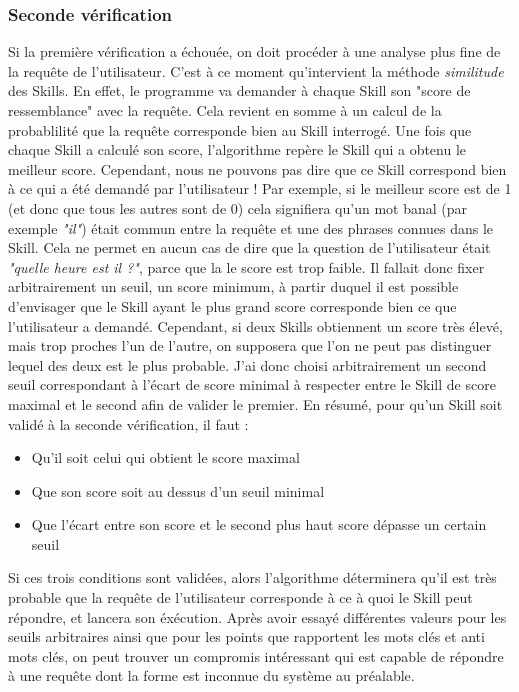\documentclass{report}
\begin{document}
      \subsubsection{Seconde vérification}
      {Si la première vérification a échouée, on doit procéder à une analyse plus
      fine de la requête de l'utilisateur. C'est à ce moment qu'intervient la
      méthode \textit{similitude} des Skills. En effet, le programme va demander
      à chaque Skill son "score de ressemblance" avec la requête. Cela revient
      en somme à un calcul de la probablilité que la requête corresponde bien au
      Skill interrogé. Une fois que chaque Skill a calculé son score, l'algorithme
      repère le Skill qui a obtenu le meilleur score. Cependant, nous ne pouvons
      pas dire que ce Skill correspond bien à ce qui a été demandé par l'utilisateur !
       Par exemple, si le meilleur score est de 1 (et donc que tous les autres sont de 0)
        cela signifiera qu'un mot banal (par exemple \textit{"il"}) était commun entre
        la requête et une des phrases connues dans le Skill. Cela ne permet en aucun cas
         de dire que la question de l'utilisateur était \textit{"quelle heure est il ?"}, parce
         que la le score est trop faible. Il fallait donc fixer arbitrairement un seuil, un score
          minimum, à partir duquel il est possible d'envisager que le Skill ayant
          le plus grand score corresponde bien ce que l'utilisateur a demandé. Cependant,
          si deux Skills obtiennent un score très élevé, mais trop proches l'un de l'autre,
           on supposera que l'on ne peut pas distinguer lequel des deux est le plus probable.
           J'ai donc choisi arbitrairement un second seuil correspondant à l'écart de score
           minimal à respecter entre le Skill de score maximal et le second afin de valider
           le premier.}
      {En résumé, pour qu'un Skill soit validé à la seconde vérification, il faut :}
      \begin{itemize}
        \item Qu'il soit celui qui obtient le score maximal
        \item Que son score soit au dessus d'un seuil minimal
        \item Que l'écart entre son score et le second plus haut score dépasse un certain seuil
      \end{itemize}
      {Si ces trois conditions sont validées, alors l'algorithme déterminera qu'il est très
      probable que la requête de l'utilisateur corresponde à ce à quoi le Skill peut répondre,
      et lancera son éxécution. Après avoir essayé différentes valeurs pour les seuils
      arbitraires ainsi que pour les points que rapportent les mots clés et anti mots clés,
      on peut trouver un compromis intéressant qui est capable de répondre à une requête
      dont la forme est inconnue du système au préalable.}
\end{document}
